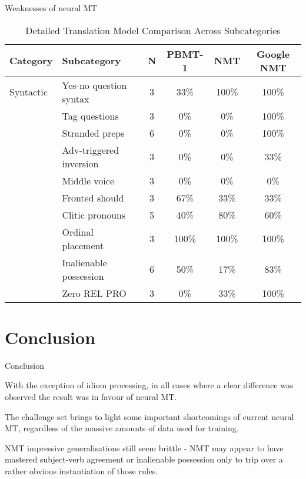 \documentclass{beamer}
\begin{document}
\begin{frame}{Weaknesses of neural MT}

  {\tiny %
  \begin{table}[htbp]
    \centering
    \caption{Detailed Translation Model Comparison Across Subcategories}
    \label{tab:detailed_translation_model_comparison}
    \begin{tabularx}{\textwidth}{XXcccc}
      \toprule
      Category & Subcategory & N & PBMT-1 & NMT & Google NMT \\
      \midrule
      Syntactic & Yes-no question syntax & 3 & 33\% & 100\% & 100\% \\
      & Tag questions & 3 & 0\% & 0\% & 100\% \\
      & Stranded preps & 6 & 0\% & 0\% & 100\% \\
      & Adv-triggered inversion & 3 & 0\% & 0\% & 33\% \\
      & Middle voice & 3 & 0\% & 0\% & 0\% \\
      & Fronted should & 3 & 67\% & 33\% & 33\% \\
      & Clitic pronouns & 5 & 40\% & 80\% & 60\% \\
      & Ordinal placement & 3 & 100\% & 100\% & 100\% \\
      & Inalienable possession & 6 & 50\% & 17\% & 83\% \\
      & Zero REL PRO & 3 & 0\% & 33\% & 100\% \\
      \bottomrule
    \end{tabularx}
  \end{table}
  }

\end{frame}


\section{Conclusion}
\begin{frame}{Conclusion}

  With the exception of idiom processing, in all cases where a clear difference was observed the result was in favour of neural MT.

  \medskip

  The challenge set brings to light some important shortcomings of current neural MT, regardless of the massive amounts of data used for training.

  \medskip

  NMT impressive generalisations still seem brittle - NMT may appear to have mastered subject-verb agreement or inalienable possession only to trip over a rather obvious instantiation of those rules.

\end{frame}
\end{document}
